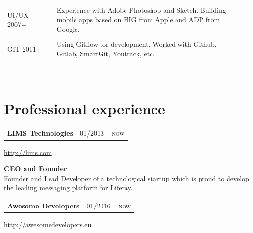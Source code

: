 \documentclass[10pt]{article} %
\begin{document}
{\begin{minipage}[t]{0.5\textwidth}
\begin{tabular}{@{}p{0.2\linewidth}p{0.75\linewidth}@{}}
\large\textsc{UI/UX} \newline \small\textsc{2007+} & 
Experience with Adobe Photoshop and Sketch. Building mobile apps based on HIG from Apple and
ADP from Google. \\
&\\

\large\textsc{GIT} \newline \small\textsc{2011+} & 
Using Gitflow for development. Worked with Github, Gitlab, SmartGit, Youtrack, etc.  \\
&\\

\end{tabular}\\[10pt]


\end{minipage} %
\hfill
\begin{minipage}[t]{0.44\textwidth} %
\vspace{50pt} %
	
	

\section{Professional experience} 
\medskip

\begin{tabularx}{\textwidth}{@{}Xr@{}}
\large\textbf{LIMS Technologies} & \small\textsc{01/2013 -- now} \\
\end{tabularx}
\normalsize\url{http://lims.com}

\medskip
\normalsize\textbf{CEO and Founder}\\
\small {Founder and Lead Developer of a technological startup which is proud to 
develop the leading messaging platform for Liferay.}\\
\medskip 


\begin{tabularx}{\textwidth}{@{}Xr@{}}
\large\textbf{Awesome Developers} & \small\textsc{01/2016 -- now} \\
\end{tabularx}
\normalsize\url{http://awesomedevelopers.eu}


\end{minipage}}
\end{document}
